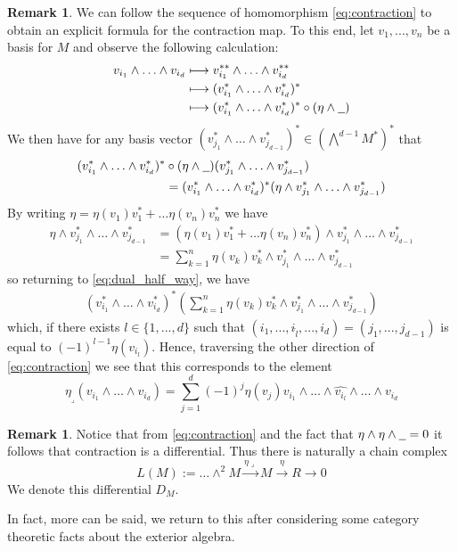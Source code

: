\documentclass[12pt]{article}
\theoremstyle{plain}
\theoremstyle{definition}
\newtheorem{remark}[thm]{Remark}
\newcommand{\und}[1]{\underline{\hspace{#1 cm}}}
\newcommand{\lto}{\longrightarrow}
\begin{document}
\begin{remark}
We can follow the sequence of homomorphism \eqref{eq:contraction} to obtain an explicit formula for the contraction map. To this end, let $v_1,...,v_n$ be a basis for $M$ and observe the following calculation:
\begin{align*}
v_{i_1} \wedge \hdots \wedge v_{i_d} &\longmapsto v_{i_1}^{\ast\ast} \wedge \hdots \wedge v_{i_d}^{\ast\ast}\\
&\longmapsto (v_{i_1}^\ast \wedge \hdots \wedge v_{i_d}^\ast)^\ast\\
&\longmapsto (v_{i_1}^\ast \wedge \hdots \wedge v_{i_d}^\ast)^\ast\circ(\eta \wedge \und{0.2})
\end{align*}
We then have for any basis vector $(v_{j_1}^\ast \wedge \hdots \wedge v_{j_{d-1}}^\ast)^\ast \in (\bigwedge^{d-1}M^\ast)^\ast$ that
\begin{align}
(v_{i_1}^\ast \wedge \hdots \wedge v_{i_d}^\ast)^\ast&\circ(\eta \wedge \und{0.2})(v_{j_1}^\ast \wedge \hdots \wedge v_{j_{d-1}}^\ast)\\
\label{eq:dual_half_way}&= (v_{i_1}^\ast \wedge \hdots \wedge v_{i_d}^\ast)^\ast(\eta \wedge v_{j_1}^\ast \wedge \hdots \wedge v_{j_{d-1}}^\ast)
\end{align}
By writing $\eta = \eta(v_1)v_1^\ast + \hdots \eta(v_n)v_n^\ast$ we have
\begin{align*}
\eta \wedge v_{j_1}^\ast \wedge \hdots \wedge v_{j_{d-1}}^\ast &= (\eta(v_1)v_1^\ast+ \hdots \eta(v_n)v_n^\ast)\wedge v_{j_1}^\ast \wedge \hdots \wedge v_{j_{d-1}}^\ast\\
&= \sum_{k = 1}^n \eta(v_k)v_k^\ast \wedge v_{j_1}^\ast \wedge \hdots \wedge v_{j_{d-1}}^\ast
\end{align*}
so returning to \eqref{eq:dual_half_way}, we have
\begin{align*}
(v_{i_1}^\ast \wedge \hdots \wedge v_{i_d}^\ast)^\ast(\sum_{k = 1}^n \eta(v_k)v_k^\ast \wedge v_{j_1}^\ast \wedge \hdots \wedge v_{j_{d-1}}^\ast)
\end{align*}
which, if there exists $l \in \lbrace 1,...,d\rbrace$ such that $(i_1,...,i_{\hat{l}},...,i_d) = (j_1,...,j_{d-1})$ is equal to $(-1)^{l-1}\eta(v_{i_l})$. Hence, traversing the other direction of \eqref{eq:contraction} we see that this corresponds to the element
\begin{equation}
\eta_{\lrcorner}(v_{i_1} \wedge \hdots \wedge v_{i_d}) = \sum_{j = 1}^d(-1)^j \eta(v_j) v_{i_1} \wedge \hdots \wedge \hat{v_{i_l}} \wedge \hdots \wedge v_{i_d}
\end{equation}
\end{remark}
\begin{remark}\label{rmk:contraction_differential}
Notice that from \eqref{eq:contraction} and the fact that $\eta \wedge \eta \wedge \und{0.2} = 0$ it follows that contraction is a differential. Thus there is naturally a chain complex
\begin{equation}
L(M) := \hdots \wedge^2 M \stackrel{\eta\lrcorner}{\lto} M \stackrel{\eta}{\lto} R \lto 0
\end{equation}
We denote this differential $D_M$.
\end{remark}
In fact, more can be said, we return to this after considering some category theoretic facts about the exterior algebra.
\end{document}
